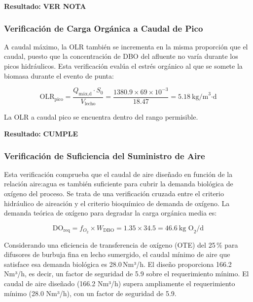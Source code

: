 \documentclass[12pt,a4paper]{article}
\begin{document}
\textbf{Resultado:} \textbf{VER NOTA}

\subsubsection*{Verificación de Carga Orgánica a Caudal de Pico}

A caudal máximo, la OLR también se incrementa en la misma proporción que el caudal, puesto que la concentración de DBO del afluente no varía durante los picos hidráulicos. Esta verificación evalúa el estrés orgánico al que se somete la biomasa durante el evento de punta:

\begin{equation}
\text{OLR}_{\text{pico}} = \frac{Q_{\text{máx,d}} \cdot S_0}{V_{\text{lecho}}} = \frac{1380.9 \times 69 \times 10^{-3}}{18.47} = 5.18\ \text{kg/m}^3\text{·d}
\end{equation}

La OLR a caudal pico se encuentra dentro del rango permisible.

\textbf{Resultado:} \textbf{CUMPLE}

\subsubsection*{Verificación de Suficiencia del Suministro de Aire}

Esta verificación comprueba que el caudal de aire diseñado en función de la relación aire:agua es también suficiente para cubrir la demanda biológica de oxígeno del proceso. Se trata de una verificación cruzada entre el criterio hidráulico de aireación y el criterio bioquímico de demanda de oxígeno. La demanda teórica de oxígeno para degradar la carga orgánica media es:

\begin{equation}
\text{DO}_{\text{req}} = f_{O_2} \times W_{\text{DBO}} = 1.35 \times 34.5 = 46.6\ \text{kg O}_2\text{/d}
\end{equation}

Considerando una eficiencia de transferencia de oxígeno (OTE) del 25\,\% para difusores de burbuja fina en lecho sumergido, el caudal mínimo de aire que satisface esa demanda biológica es 28.0\,Nm³/h. El diseño proporciona 166.2\,Nm³/h, es decir, un factor de seguridad de 5.9 sobre el requerimiento mínimo. El caudal de aire diseñado (166.2 Nm³/h) supera ampliamente el requerimiento mínimo (28.0 Nm³/h), con un factor de seguridad de 5.9.
\end{document}
